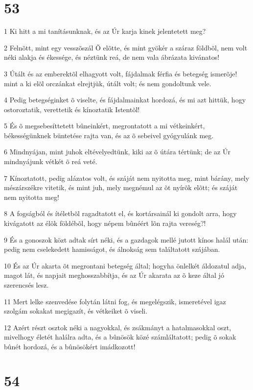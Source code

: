 \chapter{53}

\par 1 Ki hitt a mi tanításunknak, és az Úr karja kinek jelentetett meg?
\par 2 Felnõtt, mint egy vesszõszál Õ elõtte, és mint gyökér a száraz földbõl, nem volt néki alakja és ékessége, és néztünk reá, de nem vala ábrázata kivánatos!
\par 3 Útált és az emberektõl elhagyott volt, fájdalmak férfia és betegség ismerõje! mint a ki elõl orczánkat elrejtjük, útált volt; és nem gondoltunk vele.
\par 4 Pedig betegséginket õ viselte, és fájdalmainkat hordozá, és mi azt hittük, hogy ostoroztatik, verettetik és kínoztatik Istentõl!
\par 5 És õ megsebesíttetett bûneinkért, megrontatott a mi vétkeinkért, békességünknek büntetése rajta van, és az õ sebeivel gyógyulánk meg.
\par 6 Mindnyájan, mint juhok eltévelyedtünk, kiki az õ útára tértünk; de az Úr mindnyájunk vétkét õ reá veté.
\par 7 Kínoztatott, pedig alázatos volt, és száját nem nyitotta meg, mint bárány, mely mészárszékre vitetik, és mint juh, mely megnémul az õt nyírõk elõtt; és száját nem nyitotta meg!
\par 8 A fogságból és ítéletbõl ragadtatott el, és kortársainál ki gondolt arra, hogy kivágatott az élõk földébõl, hogy népem bûnéért lõn rajta vereség?!
\par 9 És a gonoszok közt adtak sírt néki, és a gazdagok mellé jutott kínos halál után: pedig nem cselekedett hamisságot, és álnokság sem találtatott szájában.
\par 10 És az Úr akarta õt megrontani betegség által; hogyha önlelkét áldozatul adja, magot lát, és napjait meghosszabbítja, és az Úr akarata az õ keze által jó szerencsés lesz.
\par 11 Mert lelke szenvedése folytán látni fog, és megelégszik, ismeretével igaz szolgám sokakat megigazít, és vétkeiket õ viseli.
\par 12 Azért részt osztok néki a nagyokkal, és zsákmányt a hatalmasokkal oszt, mivelhogy életét halálra adta, és a bûnösök közé számláltatott; pedig õ sokak bûnét hordozá, és a bûnösökért imádkozott!

\chapter{54}

